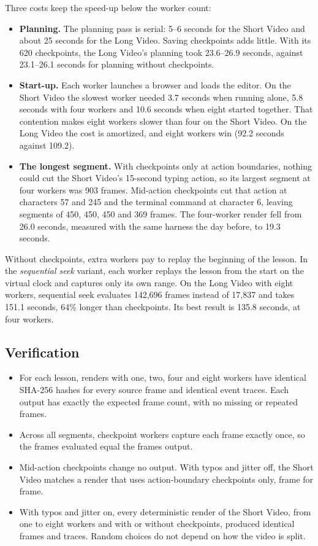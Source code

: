 \documentclass[11pt, a4paper]{article}
\begin{document}
\begin{appendices}
Three costs keep the speed-up below the worker count:

\begin{itemize}
    \item \textbf{Planning.} The planning pass is serial: 5--6 seconds for the Short Video and about 25 seconds for the Long Video. Saving checkpoints adds little. With its 620 checkpoints, the Long Video's planning took 23.6--26.9 seconds, against 23.1--26.1 seconds for planning without checkpoints.
    \item \textbf{Start-up.} Each worker launches a browser and loads the editor. On the Short Video the slowest worker needed 3.7 seconds when running alone, 5.8 seconds with four workers and 10.6 seconds when eight started together. That contention makes eight workers slower than four on the Short Video. On the Long Video the cost is amortized, and eight workers win (92.2 seconds against 109.2).
    \item \textbf{The longest segment.} With checkpoints only at action boundaries, nothing could cut the Short Video's 15-second typing action, so its largest segment at four workers was 903 frames. Mid-action checkpoints cut that action at characters 57 and 245 and the terminal command at character 6, leaving segments of 450, 450, 450 and 369 frames. The four-worker render fell from 26.0 seconds, measured with the same harness the day before, to 19.3 seconds.
\end{itemize}

Without checkpoints, extra workers pay to replay the beginning of the lesson. In the \textit{sequential seek} variant, each worker replays the lesson from the start on the virtual clock and captures only its own range. On the Long Video with eight workers, sequential seek evaluates 142,696 frames instead of 17,837 and takes 151.1 seconds, 64\% longer than checkpoints. Its best result is 135.8 seconds, at four workers.

\subsection{Verification}

\begin{itemize}
    \item For each lesson, renders with one, two, four and eight workers have identical SHA-256 hashes for every source frame and identical event traces. Each output has exactly the expected frame count, with no missing or repeated frames.
    \item Across all segments, checkpoint workers capture each frame exactly once, so the frames evaluated equal the frames output.
    \item Mid-action checkpoints change no output. With typos and jitter off, the Short Video matches a render that uses action-boundary checkpoints only, frame for frame.
    \item With typos and jitter on, every deterministic render of the Short Video, from one to eight workers and with or without checkpoints, produced identical frames and traces. Random choices do not depend on how the video is split.
\end{itemize}


\end{appendices}
\end{document}
